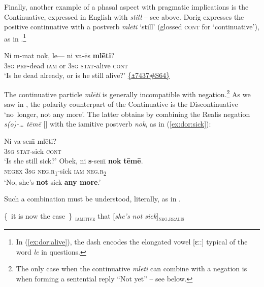 \documentclass[output=paper,colorlinks,citecolor=brown,draft]{langscibook}
\begin{document}
Finally, another example of a phasal aspect with pragmatic implications is the Continuative, expressed in English with \textit{still} – see  above. Dorig expresses the positive continuative with a postverb \textit{mlēti} ‘still’ (glossed \textsc{cont} for ‘continuative’), as in .\footnote{In (\ref{ex:dor:alive}), the dash encodes the elongated vowel [ɛːː] typical of the word \textit{le} in questions.}

\ea\label{ex:dor:alive} 
    \gll  Ni m-mat nok, le— ni va-ēs \textbf{mlēti}?\\ 
          \textsc{3sg} \textsc{prf}-dead \textsc{iam} or \textsc{3sg} \textsc{stat-}alive \textsc{cont}\\
    \glt ‘Is he dead already, or is he still alive?’ \quad \href{https://doi.org/10.24397/pangloss-0007437#S64}{\{\texttt{⚓}7437\#S64\}}
\z  

The continuative particle \textit{mlēti} is generally incompatible with negation.\footnote{The only case when the continuative \textit{mlēti} can combine with a negation is when forming a sentential reply “Not yet” – see  below.} As we saw in , the polarity counterpart of the Continuative is the Discontinuative ‘no~longer, not any more’. The latter obtains by combining the Realis negation \textit{s(o)-… tēmē} [] with the iamitive postverb \textit{nok}, as in (\ref{ex:dor:sick}):

\ea\label{ex:dor:sick}
    \begin{xlist}[A: ]
    \label{ex:dor:sick1}
        \gll  Ni va-se\={m} mlēti?\\ 
              \textsc{3sg} \textsc{stat-}sick \textsc{cont}\\ 
        \glt ‘Is she still sick?'
    \label{ex:dor:sick2}
        \gll  Obek, ni \textbf{s}-se\={m} \textbf{nok} \textbf{tēmē}.\\ 
               \textsc{negex} \textsc{3sg} \textsc{neg.r\textsubscript{1}}-sick \textsc{iam} \textsc{neg.r\textsubscript{2}}\\
        \glt ‘No, she’s \textbf{not} sick \textbf{any more}.’
    \end{xlist}
\z 

Such a combination must be understood, literally, as in .

\ea\label{ex:dor:it is now the case}
\{~it is now the case~\}\textsc{\textsubscript{~iamitive}} that [\textit{she’s not sick}]\textsc{\textsubscript{neg.realis}}
\z
\end{document}
